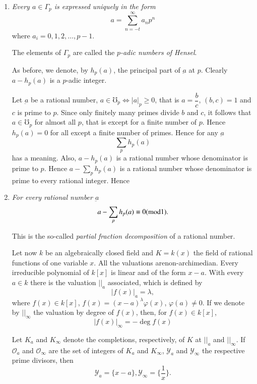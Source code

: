 \begin{enumerate}[1)]
If $\mathscr{O}_p$ denotes the set of integers of $\Gamma_p$ and
$\mathscr{Y}$ the prime ideal of the valuation then  
$$
\mathscr{Y} = (p)
$$

A set\pageoriginale of representatives of $\mathscr{O}_p \mod
\mathscr{Y}$ is given by the integers $0, 1, 2,\break \ldots , p-1$ as can
be easily seen. Hence, by (6),  

\item \textit{Every $a \in \Gamma_p$ is expressed uniquely in the form}
$$
a = \sum_{n = -t}^{\infty} a_n p^n
$$
where $a_i = 0, 1, 2, \ldots , p-1$.

The elements of $\Gamma_p$ are called the \textit{$p$-adic numbers of
  Hensel}. 

As before, we denote, by $h_p (a)$, the principal part of
$\underbar{a}$ at $p$. Clearly $a-h _p (a)$ is a $p$-adic integer. 

Let $\underbar{a}$ be a rational number, $a \in \mho_p \Leftrightarrow
|a|_p \ge 0$, that is $a = \dfrac{b}{c}$, $(b, c) = 1$ and $c$ is prime
to $p$. Since only finitely many primes divide $b$ and $c$, it follows
that $a \in \mho_p$ for almost all $p$, that is except for a
finite number of $p$. Hence $h_p(a) = 0$ for all except a finite
number of primes. Hence for any $\underbar{a}$ 
$$
\sum_p h_p (a)
$$ 
has a meaning. Also, $a - h_p (a)$ is a rational number whose
denominator is prime to $p$. Hence $a - \sum \limits_p h_p(a)$ is a
rational number whose denominator is prime to every rational
integer. Hence 

\item \textit{For every rational number $ \underbar{a}$}
$$
a - \sum_p h_p (a) \equiv 0 ({\rm mod} 1).
$$

This is the so-called \textit{partial fraction decomposition} of a
rational number. 

Let now $k$ be an  algebraically closed field and $K = k(x)$ the field
of rational functions of one variable $x$. All the valuations
are\pageoriginale non-archimedian. Every irreducible polynomial of $k
[x]$ is linear and of the form $x - a$. With every $a \in k$ there is
the valuation $| |_a$ associated, which is defined by   
$$
|f(x)|_a = \lambda , 
$$
where $f(x) \in k [x]$, $f(x) = (x - a)^\lambda \varphi(x)$, $\varphi (a)
\neq 0$. If we denote by $| |_\infty$ the valuation by degree of
$f(x)$, then, for $f(x) \in k[x]$, 
$$
|f(x)|_\infty = - \deg f(x)
$$

Let $K_a$ and $K_\infty$ denote the completions, respectively, of $K$
at $| |_a$ and $| |_\infty$. If $\mathscr{O}_a$ and
$\mathscr{O}_\infty$ are the set of integers of $K_a$ and $K_\infty$,
$\mathscr{Y}_a$ and $\mathscr{Y}_\infty$ the respective prime divisors,
then 
$$
\mathscr{Y}_a = \{ x - a\} , \mathscr{Y}_\infty = \{ \frac{1}{x}\} .
$$


\end{enumerate}
